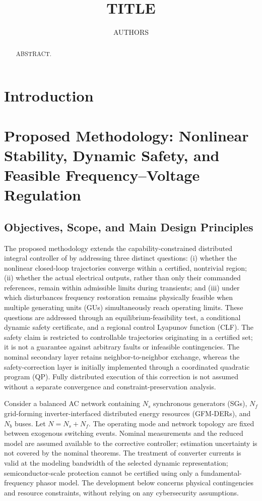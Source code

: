\documentclass[11pt,twocolumn]{article}
\title{TITLE}
\author{AUTHORS}
\begin{document}
\maketitle

\begin{abstract}
ABSTRACT.
\end{abstract}

\section{Introduction}
\label{sec:introduction}

\section{Proposed Methodology: Nonlinear Stability, Dynamic Safety, and Feasible Frequency--Voltage Regulation}

\label{sec:methodology}

\subsection{Objectives, Scope, and Main Design Principles}

\label{subsec:objectives}

The proposed methodology extends the capability-constrained distributed integral controller of \cite{Kavvathas2025Resilient} by addressing three distinct questions: (i) whether the nonlinear closed-loop trajectories converge within a certified, nontrivial region; (ii) whether the actual electrical outputs, rather than only their commanded references, remain within admissible limits during transients; and (iii) under which disturbances frequency restoration remains physically feasible when multiple generating units (GUs) simultaneously reach operating limits. These questions are addressed through an equilibrium-feasibility test, a conditional dynamic safety certificate, and a regional control Lyapunov function (CLF). The safety claim is restricted to controllable trajectories originating in a certified set; it is not a guarantee against arbitrary faults or infeasible contingencies. The nominal secondary layer retains neighbor-to-neighbor exchange, whereas the safety-correction layer is initially implemented through a coordinated quadratic program (QP). Fully distributed execution of this correction is not assumed without a separate convergence and constraint-preservation analysis.

Consider a balanced AC network containing $N_s$ synchronous generators (SGs), $N_f$ grid-forming inverter-interfaced distributed energy resources (GFM-DERs), and $N_b$ buses. Let $N=N_s+N_f$. The operating mode and network topology are fixed between exogenous switching events. Nominal measurements and the reduced model are assumed available to the corrective controller; estimation uncertainty is not covered by the nominal theorems. The treatment of converter currents is valid at the modeling bandwidth of the selected dynamic representation; semiconductor-scale protection cannot be certified using only a fundamental-frequency phasor model. The development below concerns physical contingencies and resource constraints, without relying on any cybersecurity assumptions.
\end{document}
